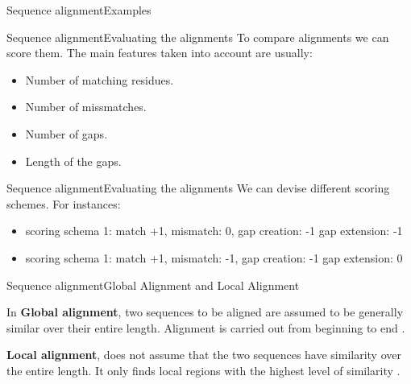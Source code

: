 \documentclass[10pt]{beamer}
\begin{document}
{\begin{frame}{Sequence alignment}{Examples}
\end{frame}

\begin{frame}{Sequence alignment}{Evaluating the alignments}
To compare alignments we can score them. The main features taken into account are usually: 
\begin{itemize}
	\item Number of matching residues.
	\item Number of missmatches.
	\item Number of gaps.
	\item Length of the gaps.
\end{itemize}
\end{frame}

\begin{frame}{Sequence alignment}{Evaluating the alignments}
	We can devise different scoring schemes. For instances:
	\begin{itemize}
		\item scoring schema 1: match +1, mismatch: 0, gap creation: -1 gap extension: -1
		\item scoring schema 1: match +1, mismatch: -1, gap creation: -1 gap extension: 0
	\end{itemize}
\end{frame}



\begin{frame}{Sequence alignment}{Global Alignment and Local Alignment}

\begin{block}{}
\centering
In \textbf{Global alignment}, two sequences to be aligned are assumed to be generally similar over their entire length. Alignment is carried out from beginning to end \cite{xiong2006essential}.
\end{block}
\begin{block}{}
\centering
\textbf{Local alignment}, does not assume that the two sequences have similarity over the entire length. It only finds local regions with the highest level of similarity \cite{xiong2006essential}.
\end{block}
\end{frame}


}
\end{document}
